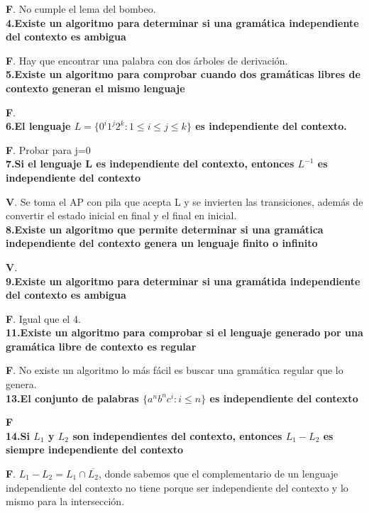 \documentclass[a4paper,11pt]{article}
\begin{document}
\textbf{F}. No cumple el lema del bombeo. \\

\textbf{4.Existe un algoritmo para determinar si una gramática independiente del contexto es ambigua}

\textbf{F}. Hay que encontrar una palabra con dos árboles de derivación. \\

\textbf{5.Existe un algoritmo para comprobar cuando dos gramáticas libres de contexto generan el mismo lenguaje}

\textbf{F}. \\

\textbf{6.El lenguaje $L=\{0^i1^j2^k:1 \leq i \leq j \leq k\}$ es independiente del contexto.}

\textbf{F}. Probar para j=0\\

\textbf{7.Si el lenguaje L es independiente del contexto, entonces $L^{-1}$ es independiente del contexto}

\textbf{V}. Se toma el AP con pila que acepta L y se invierten las transiciones, además de convertir el estado inicial en final y el final en inicial. \\

\textbf{8.Existe un algoritmo que permite determinar si una gramática independiente del contexto genera un lenguaje finito o infinito}

\textbf{V}. \\

\textbf{9.Existe un algoritmo para determinar si una gramátida independiente del contexto es ambigua}

\textbf{F}. Igual que el 4.\\

\textbf{11.Existe un algoritmo para comprobar si el lenguaje generado por una gramática libre de contexto es regular}

\textbf{F}. No existe un algoritmo lo más fácil es buscar una gramática regular que lo genera. \\

\textbf{13.El conjunto de palabras $\{a^nb^nc^i:i \leq n\}$ es independiente del contexto}

\textbf{F} \\

\textbf{14.Si $L_1$ y $L_2$ son independientes del contexto, entonces $L_1-L_2$ es siempre independiente del contexto}

\textbf{F}. $L_1-L_2=L_1\cap \overline{L_2}$, donde sabemos que el complementario de un lenguaje independiente del contexto no tiene porque ser independiente del contexto y lo mismo para la intersección. \\
\end{document}
